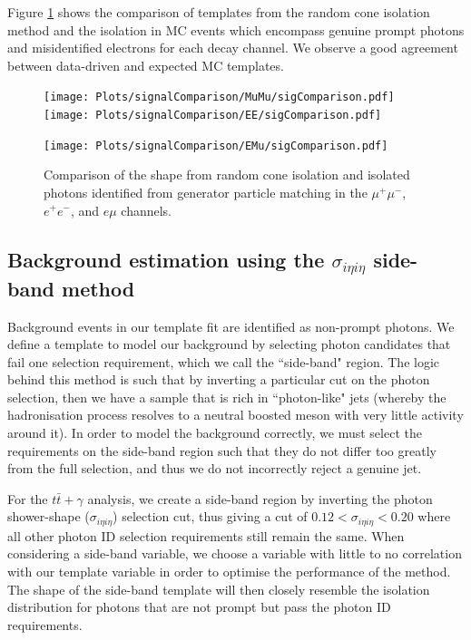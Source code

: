 Figure \ref{fig-signalComparison} shows the comparison of templates from the random cone isolation method and the isolation in MC events which encompass genuine prompt photons and misidentified electrons for each decay channel. We observe a good agreement between data-driven and expected MC templates.   

\begin{figure}
\texttt{[image: Plots/signalComparison/MuMu/sigComparison.pdf]}
\texttt{[image: Plots/signalComparison/EE/sigComparison.pdf]}
\begin{center}
\texttt{[image: Plots/signalComparison/EMu/sigComparison.pdf]}
\end{center}
\caption{Comparison of the shape from random cone isolation and isolated photons identified from generator particle matching in the $\mu^{+}\mu^{-}$, $e^{+}e^{-}$, and $e\mu$ channels.}
\label{fig-signalComparison}
\end{figure}

\subsection{Background estimation using the $\sigma_{i \eta i \eta}$ side-band method} \label{subsec-BackgroundEstimation}

Background events in our template fit are identified as non-prompt photons. We define a template to model our background by selecting photon candidates that fail one selection requirement, which we call the ``side-band" region. The logic behind this method is such that by inverting a particular cut on the photon selection, then we have a sample that is rich in ``photon-like" jets (whereby the hadronisation process resolves to a neutral boosted meson with very little activity around it). In order to model the background correctly, we must select the requirements on the side-band region such that they do not differ too greatly from the full selection, and thus we do not incorrectly reject a genuine jet. 

For the $t\bar{t}+\gamma$ analysis, we create a side-band region by inverting the photon shower-shape ($\sigma_{i\eta i\eta}$) selection cut, thus giving a cut of $0.12 < \sigma_{i \eta i \eta} < 0.20$ where all other photon ID selection requirements still remain the same. When considering a side-band variable, we choose a variable with little to no correlation with our template variable in order to optimise the performance of the method. The shape of the side-band template will then closely resemble the isolation distribution for photons that are not prompt but pass the photon ID requirements. 

